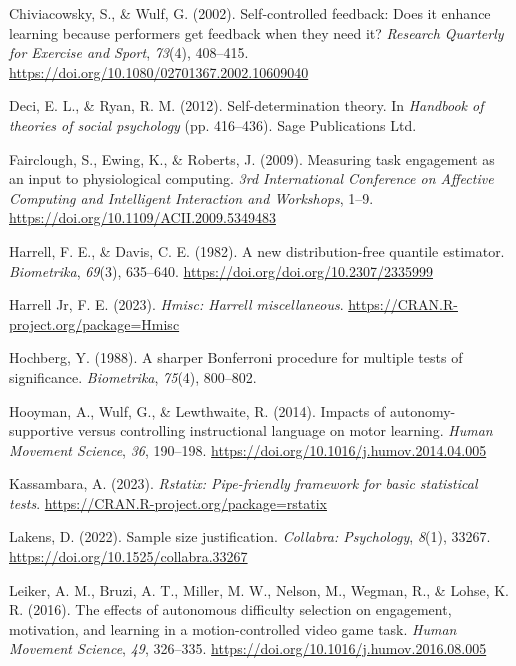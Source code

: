 \documentclass[
  doc, donotrepeattitle,floatsintext]{apa7}
\newlength{\cslhangindent}
\newlength{\cslentryspacingunit} %
\newenvironment{CSLReferences}[2] %
 {%
  \setlength{\parindent}{0pt}
  \ifodd #1
  \let\oldpar\par
  \def\par{\hangindent=\cslhangindent\oldpar}
  \fi
  \setlength{\parskip}{#2\cslentryspacingunit}
 }%
 {}
\begin{document}
\begin{CSLReferences}{1}{0}
\leavevmode{}%
Chiviacowsky, S., \& Wulf, G. (2002). Self-controlled feedback: {Does} it enhance learning because performers get feedback when they need it? \emph{Research Quarterly for Exercise and Sport}, \emph{73}(4), 408--415. \url{https://doi.org/10.1080/02701367.2002.10609040}

\leavevmode{}%
Deci, E. L., \& Ryan, R. M. (2012). Self-determination theory. In \emph{Handbook of theories of social psychology} (pp. 416--436). {Sage Publications Ltd}.

\leavevmode{}%
Fairclough, S., Ewing, K., \& Roberts, J. (2009). Measuring task engagement as an input to physiological computing. \emph{3rd {International Conference} on {Affective Computing} and {Intelligent Interaction} and {Workshops}}, 1--9. \url{https://doi.org/10.1109/ACII.2009.5349483}

\leavevmode{}%
Harrell, F. E., \& Davis, C. E. (1982). A new distribution-free quantile estimator. \emph{Biometrika}, \emph{69}(3), 635--640. \url{https://doi.org/doi.org/10.2307/2335999}

\leavevmode{}%
Harrell Jr, F. E. (2023). \emph{Hmisc: Harrell miscellaneous}. \url{https://CRAN.R-project.org/package=Hmisc}

\leavevmode{}%
Hochberg, Y. (1988). A sharper {Bonferroni} procedure for multiple tests of significance. \emph{Biometrika}, \emph{75}(4), 800--802.

\leavevmode{}%
Hooyman, A., Wulf, G., \& Lewthwaite, R. (2014). Impacts of autonomy-supportive versus controlling instructional language on motor learning. \emph{Human Movement Science}, \emph{36}, 190--198. \url{https://doi.org/10.1016/j.humov.2014.04.005}

\leavevmode{}%
Kassambara, A. (2023). \emph{Rstatix: Pipe-friendly framework for basic statistical tests}. \url{https://CRAN.R-project.org/package=rstatix}

\leavevmode{}%
Lakens, D. (2022). Sample size justification. \emph{Collabra: Psychology}, \emph{8}(1), 33267. \url{https://doi.org/10.1525/collabra.33267}

\leavevmode{}%
Leiker, A. M., Bruzi, A. T., Miller, M. W., Nelson, M., Wegman, R., \& Lohse, K. R. (2016). The effects of autonomous difficulty selection on engagement, motivation, and learning in a motion-controlled video game task. \emph{Human Movement Science}, \emph{49}, 326--335. \url{https://doi.org/10.1016/j.humov.2016.08.005}


\end{CSLReferences}
\end{document}
